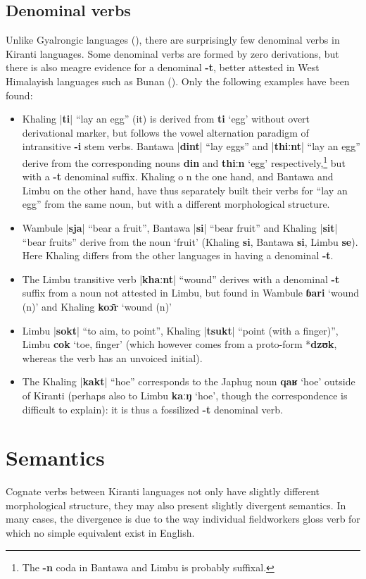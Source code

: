 \documentclass[oldfontcommands,oneside,a4paper,11pt]{article}
\newcommand{\ipa}[1]{\textbf{{\phon\mbox{#1}}}} %
\newcommand{\dhatu}[2]{|\ipa{#1}| ``#2''}
\begin{document}
\subsection{Denominal verbs} \label{sec:denom}
Unlike Gyalrongic languages (\citealt{jacques14antipassive}), there are surprisingly few denominal verbs in Kiranti languages. Some denominal verbs are formed by zero derivations, but there is also meagre evidence for a denominal \ipa{-t}, better attested in West Himalayish languages such as Bunan (\citealt[426]{widmer14bunan}). Only the following examples have been found:
\begin{itemize}
\item Khaling \dhatu{ti}{lay an egg} (it) is derived from \ipa{ti} `egg' without overt derivational marker, but follows the vowel alternation paradigm of intransitive \ipa{-i} stem verbs. Bantawa \dhatu{dint}{lay eggs} and \dhatu{thiːnt}{lay an egg} derive from the corresponding nouns  \ipa{din} and \ipa{thiːn} `egg' respectively,\footnote{The \ipa{-n} coda in Bantawa and Limbu is probably suffixal.} but with a \ipa{-t} denominal suffix. Khaling o n the one hand, and Bantawa and Limbu on the other hand, have thus separately built their verbs for ``lay an egg'' from the same noun, but with a different morphological structure.
\item Wambule \dhatu{sja}{bear a fruit}, Bantawa  \dhatu{si}{bear fruit} and Khaling \dhatu{sit}{bear fruits} derive from the noun `fruit' (Khaling \ipa{si},  Bantawa \ipa{si}, Limbu \ipa{se}). Here Khaling differs from the other languages in having a denominal \ipa{-t}.
 \item The Limbu transitive verb \dhatu{khaːnt}{wound} derives with a denominal \ipa{-t} suffix from a noun not attested in Limbu, but found in Wambule \ipa{ɓari} `wound (n)' and Khaling \ipa{koɔ̄r} `wound (n)'
 \item Limbu \dhatu{sokt}{to aim, to point}, Khaling \dhatu{tsukt}{point (with a finger)}, Limbu \ipa{cok} `toe, finger' (which however comes from a proto-form *\ipa{dzʊk}, whereas the verb has an unvoiced initial).
 \item The Khaling \dhatu{kakt}{hoe} corresponds to the Japhug noun \ipa{qaʁ} `hoe' outside of Kiranti (perhaps also to Limbu \ipa{kaːŋ} `hoe', though the correspondence is difficult to explain): it is thus a fossilized \ipa{-t} denominal verb.
\end{itemize}  

\section{Semantics}
Cognate verbs between Kiranti languages not only have slightly different morphological structure, they may also present slightly divergent semantics. In many cases, the divergence is due to the way individual fieldworkers gloss verb for which no simple equivalent exist in English.
\end{document}
